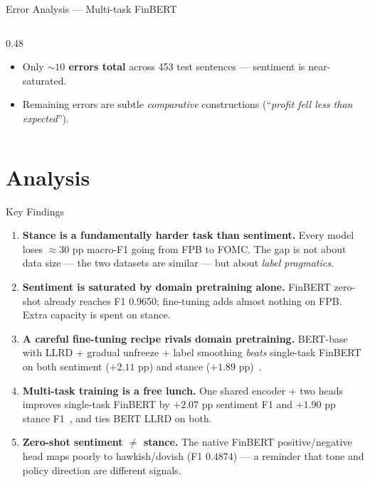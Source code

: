 \documentclass[10pt, aspectratio=169]{beamer}
\begin{document}
\begin{frame}{Error Analysis --- Multi-task FinBERT}
\begin{columns}[T]
\begin{column}{0.48\textwidth}
            \vspace{0.4em}
            {\footnotesize
            \begin{itemize}\setlength{\itemsep}{1pt}
                \item Only \textbf{$\sim 10$ errors total} across 453 test sentences --- sentiment is near-saturated.
                \item Remaining errors are subtle \textit{comparative} constructions (``\textit{profit fell less than expected}'').
            \end{itemize}
            }
        \end{column}
    \end{columns}
\end{frame}

\section{Analysis}

\begin{frame}{Key Findings}
    \begin{enumerate}\setlength{\itemsep}{0.35em}
        \item \textbf{Stance is a fundamentally harder task than sentiment.} Every model loses $\approx 30$ pp macro-F1 going from FPB to FOMC. The gap is not about data size --- the two datasets are similar --- but about \textit{label pragmatics}.
        \item \textbf{Sentiment is saturated by domain pretraining alone.} FinBERT zero-shot already reaches F1 0.9650; fine-tuning adds almost nothing on FPB. Extra capacity is spent on stance.
        \item \textbf{A careful fine-tuning recipe rivals domain pretraining.} BERT-base with LLRD + gradual unfreeze + label smoothing \textit{beats} single-task FinBERT on both sentiment ($+2.11$ pp) and stance ($+1.89$ pp)~\cite{sun2019finetune,howard2018ulmfit}.
        \item \textbf{Multi-task training is a free lunch.} One shared encoder + two heads improves single-task FinBERT by $+2.07$ pp sentiment F1 and $+1.90$ pp stance F1~\cite{liu2019mt-dnn}, and ties BERT LLRD on both.
        \item \textbf{Zero-shot sentiment $\neq$ stance.} The native FinBERT positive/negative head maps poorly to hawkish/dovish (F1 $0.4874$) --- a reminder that \alert{tone and policy direction are different signals}.
    \end{enumerate}
\end{frame}
\end{document}
